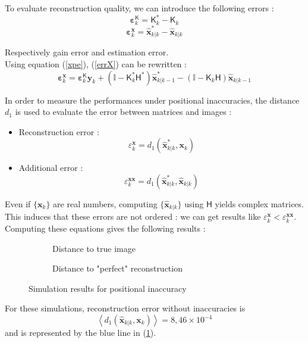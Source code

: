 \documentclass[titlepage,11pt]{article}
\renewcommand{\H}{\boldsymbol{\mathsf{H}}}
\newcommand{\K}{\boldsymbol{\mathsf{K}}}
\newcommand{\x}{\boldsymbol{x}}
\newcommand{\y}{\boldsymbol{y}}
\newcommand{\xp}{\widehat{\x}_{k|k-1}}
\newcommand{\xe}{\widehat{\x}_{k|k}}
\newcommand{\vbeps}{\boldsymbol{\varepsilon}}
\begin{document}
	To evaluate reconstruction quality, we can introduce the following errors :
	\begin{equation}
		\vbeps^{\K}_k = \K_k^* - \K_k
	\end{equation}
	\begin{equation}\label{errX}
		\vbeps^{\x}_k = \xe^* - \xe
	\end{equation}

	Respectively gain error and estimation error.\\
	Using equation (\ref{xpe}), (\ref{errX}) can be rewritten :
	\begin{equation}
		\vbeps^{\x}_k = \vbeps^{\K}_k\y_k + \left(\mathbb{I} - \K_k^*\H^*\right)\xp^* - \left(\mathbb{I} - \K_k\H\right)\xp
	\end{equation}
	
	In order to measure the performances under positional inaccuracies, the distance $d_1$ is used to evaluate the error between matrices and images :
	\begin{itemize}
		\item Reconstruction error : 
		$$
			\varepsilon_k^{\x} = d_1\left(\xe^*,\x_k\right)
		$$
		\item Additional error : 
		$$
			\varepsilon_k^{\x\x} = d_1\left(\xe^*,\xe\right)
		$$
	\end{itemize}

	Even if $\{\x_k\}$ are real numbers, computing $\{\xe\}$ using $\H$ yields complex matrices. This induces that these errors are not ordered : we can get results like $\varepsilon_k^{\x} < \varepsilon_k^{\x\x}$. 
	Computing these equations gives the following results :
	
	
	\begin{figure}[H]
		\centering
		\begin{subfigure}{.5\textwidth}
			\centering
			
			\caption{Distance to true image}
			\label{fig:p_e_x_e}
		\end{subfigure}%
		\begin{subfigure}{.5\textwidth}
			\centering
			
			\caption{Distance to "perfect" reconstruction}
		\end{subfigure}
	\caption{Simulation results for positional inaccuracy}
	\end{figure}
	
	For these simulations, reconstruction error without inaccuracies is 
	$$ %
	\left\langle d_1\left(\xe,\x_k\right)\right\rangle = 8,46\times10^{-4}
	$$
	and is represented by the blue line in (\ref{fig:p_e_x_e}).\\
	
\end{document}
